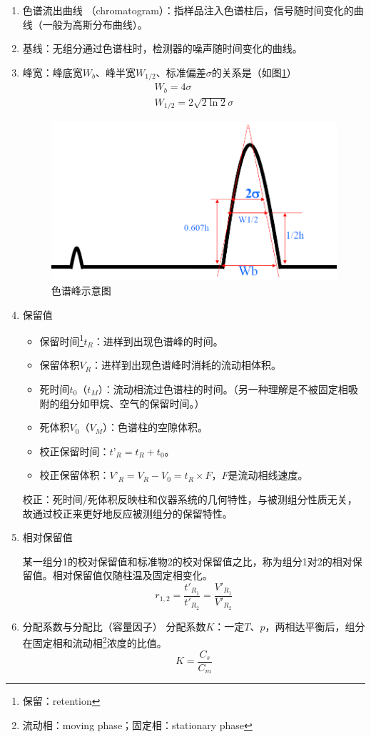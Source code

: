 \begin{enumerate}
	\item 色谱流出曲线 （chromatogram）：指样品注入色谱柱后，信号随时间变化的曲线（一般为高斯分布曲线）。
	\item 基线：无组分通过色谱柱时，检测器的噪声随时间变化的曲线。
	\item 峰宽：峰底宽$W_b$、峰半宽$W_{1/2}$、标准偏差$\sigma$的关系是（如图\ref{fig:chp1peak}）
	\begin{gather*}
		W_b=4\sigma\\
		W_{1/2}=2\sqrt{2\ln 2}\sigma
	\end{gather*}
	\begin{figure}[!h]
		\centering
		\includegraphics[width=0.45\linewidth]{image/chp1_peak}
		\caption{色谱峰示意图}
		\label{fig:chp1peak}
	\end{figure}
	\item 保留值
	\begin{itemize}
		\item 保留时间\footnote{保留：retention}$t_R$：进样到出现色谱峰的时间。
		\item 保留体积$V_R$：进样到出现色谱峰时消耗的流动相体积。
		\item 死时间$t_0$（$t_M$）：流动相流过色谱柱的时间。（另一种理解是不被固定相吸附的组分如甲烷、空气的保留时间。）
		\item 死体积$V_0$（$V_M$）：色谱柱的空隙体积。
		\item 校正保留时间：$t’_R=t_R+ t_0$。
		\item 校正保留体积：$V’_R=V_R- V_0=t_R\times F$，$F$是流动相线速度。
	\end{itemize}
		
	校正：死时间/死体积反映柱和仪器系统的几何特性，与被测组分性质无关，故通过校正来更好地反应被测组分的保留特性。
	\item 相对保留值
	
	某一组分1的校对保留值和标准物2的校对保留值之比，称为组分1对2的相对保留值。相对保留值仅随柱温及固定相变化。
	\begin{equation*}
	r_{1,2}=\dfrac{t'_{R_1}}{t'_{R_2}}=\dfrac{V'_{R_1}}{V'_{R_2}}
	\end{equation*}
	\item 分配系数与分配比（容量因子）
	分配系数$K$：一定$T$、$p$，两相达平衡后，组分在固定相和流动相\footnote{流动相：moving phase；固定相：stationary phase}浓度的比值。	
	\begin{equation*}
		K=\dfrac{C_s}{C_m}
	\end{equation*}
	

\end{enumerate}
